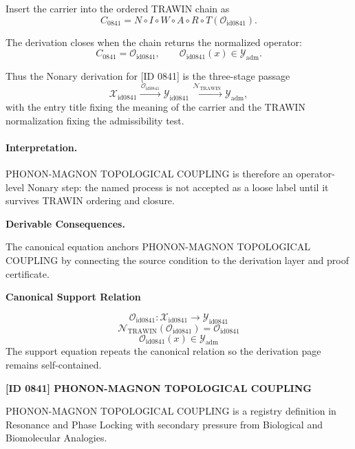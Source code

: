 Insert the carrier into the ordered TRAWIN chain as\[
C_{0841}=N\circ I\circ W\circ A\circ R\circ T(\mathcal{O}_{\mathrm{id0841}}).
\]

The derivation closes when the chain returns the normalized operator:\[
C_{0841}=\mathcal{O}_{\mathrm{id0841}},\qquad \mathcal{O}_{\mathrm{id0841}}(x)\in\mathcal{Y}_{\mathrm{adm}}.
\]

Thus the Nonary derivation for [ID 0841] is the three-stage passage
\[
\mathcal{X}_{\mathrm{id0841}}\xrightarrow{\,\mathcal{O}_{\mathrm{id0841}}\,} \mathcal{Y}_{\mathrm{id0841}}\xrightarrow{\,\mathcal{N}_{\mathrm{TRAWIN}}\,} \mathcal{Y}_{\mathrm{adm}},
\]
with the entry title fixing the meaning of the carrier and the TRAWIN normalization fixing the admissibility test.

\paragraph{Interpretation.} PHONON-MAGNON TOPOLOGICAL COUPLING is therefore an operator-level Nonary step: the named process is not accepted as a loose label until it survives TRAWIN ordering and closure.

\par\vspace{0.35em}
\noindent\textbf{Derivable Consequences.}\quad
\begingroup
\footnotesize
\raggedright
The canonical equation anchors PHONON-MAGNON TOPOLOGICAL COUPLING by connecting the source condition to the derivation layer and proof certificate.
\par\endgroup

\noindent\textbf{Canonical Support Relation}\par
\[
\mathcal{O}_{\mathrm{id0841}}:\mathcal{X}_{\mathrm{id0841}}\longrightarrow\mathcal{Y}_{\mathrm{id0841}}
\]
\[
\mathcal{N}_{\mathrm{TRAWIN}}(\mathcal{O}_{\mathrm{id0841}})=\mathcal{O}_{\mathrm{id0841}}
\]
\[
\mathcal{O}_{\mathrm{id0841}}(x)\in\mathcal{Y}_{\mathrm{adm}}
\]
\noindent The support equation repeats the canonical relation so the derivation page remains self-contained.\par

\clearpage
\noindent\textbf{[ID 0841] PHONON-MAGNON TOPOLOGICAL COUPLING}\par
\vspace{0.35em}
\begingroup\small
{}
PHONON-MAGNON TOPOLOGICAL COUPLING is a registry definition in Resonance and Phase Locking with secondary pressure from Biological and Biomolecular Analogies.


